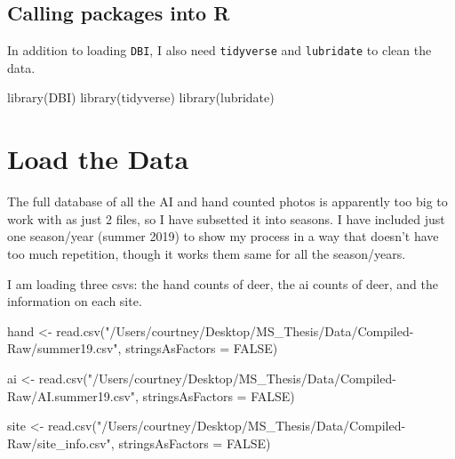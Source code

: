 \documentclass[
]{book}
\newenvironment{Shaded}{\begin{snugshade}}{\end{snugshade}}
\newcommand{\AttributeTok}[1]{\textcolor[rgb]{0.77,0.63,0.00}{#1}}
\newcommand{\ConstantTok}[1]{\textcolor[rgb]{0.00,0.00,0.00}{#1}}
\newcommand{\FunctionTok}[1]{\textcolor[rgb]{0.00,0.00,0.00}{#1}}
\newcommand{\NormalTok}[1]{#1}
\newcommand{\OtherTok}[1]{\textcolor[rgb]{0.56,0.35,0.01}{#1}}
\newcommand{\StringTok}[1]{\textcolor[rgb]{0.31,0.60,0.02}{#1}}
\begin{document}
\hypertarget{calling-packages-into-r}{%
\subsection{Calling packages into R}\label{calling-packages-into-r}}

In addition to loading \texttt{DBI}, I also need \texttt{tidyverse} and \texttt{lubridate} to clean the data.

\begin{Shaded}
\begin{Highlighting}[]
\FunctionTok{library}\NormalTok{(DBI)}
\FunctionTok{library}\NormalTok{(tidyverse)}
\FunctionTok{library}\NormalTok{(lubridate)}
\end{Highlighting}
\end{Shaded}

\hypertarget{load-the-data}{%
\section{Load the Data}\label{load-the-data}}

The full database of all the AI and hand counted photos is apparently too big to work with as just 2 files, so I have subsetted it into seasons. I have included just one season/year (summer 2019) to show my process in a way that doesn't have too much repetition, though it works them same for all the season/years.

I am loading three csvs: the hand counts of deer, the ai counts of deer, and the information on each site.

\begin{Shaded}
\begin{Highlighting}[]
\NormalTok{hand }\OtherTok{\textless{}{-}} \FunctionTok{read.csv}\NormalTok{(}\StringTok{"/Users/courtney/Desktop/MS\_Thesis/Data/Compiled{-}Raw/summer19.csv"}\NormalTok{, }\AttributeTok{stringsAsFactors =} \ConstantTok{FALSE}\NormalTok{)}

\NormalTok{ai }\OtherTok{\textless{}{-}} \FunctionTok{read.csv}\NormalTok{(}\StringTok{"/Users/courtney/Desktop/MS\_Thesis/Data/Compiled{-}Raw/AI.summer19.csv"}\NormalTok{, }\AttributeTok{stringsAsFactors =} \ConstantTok{FALSE}\NormalTok{)}

\NormalTok{site }\OtherTok{\textless{}{-}} \FunctionTok{read.csv}\NormalTok{(}\StringTok{"/Users/courtney/Desktop/MS\_Thesis/Data/Compiled{-}Raw/site\_info.csv"}\NormalTok{, }\AttributeTok{stringsAsFactors =} \ConstantTok{FALSE}\NormalTok{)}
\end{Highlighting}
\end{Shaded}
\end{document}
